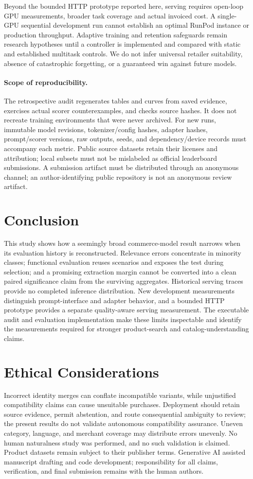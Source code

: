 Beyond the bounded HTTP prototype reported here, serving requires open-loop GPU measurements, broader task coverage and actual invoiced cost. A single-GPU sequential development run cannot establish an optimal RunPod instance or production throughput. Adaptive training and retention safeguards remain research hypotheses until a controller is implemented and compared with static and established multitask controls. We do not infer universal retailer suitability, absence of catastrophic forgetting, or a guaranteed win against future models.

\paragraph{Scope of reproducibility.}
The retrospective audit regenerates tables and curves from saved evidence, exercises actual scorer counterexamples, and checks source hashes. It does not recreate training environments that were never archived. For new runs, immutable model revisions, tokenizer/config hashes, adapter hashes, prompt/scorer versions, raw outputs, seeds, and dependency/device records must accompany each metric. Public source datasets retain their licenses and attribution; local subsets must not be mislabeled as official leaderboard submissions. A submission artifact must be distributed through an anonymous channel; an author-identifying public repository is not an anonymous review artifact.

\section{Conclusion}
This study shows how a seemingly broad commerce-model result narrows when its evaluation history is reconstructed. Relevance errors concentrate in minority classes; functional evaluation reuses scenarios and exposes the test during selection; and a promising extraction margin cannot be converted into a clean paired significance claim from the surviving aggregates. Historical serving traces provide no completed inference distribution. New development measurements distinguish prompt-interface and adapter behavior, and a bounded HTTP prototype provides a separate quality-aware serving measurement. The executable audit and evaluation implementation make these limits inspectable and identify the measurements required for stronger product-search and catalog-understanding claims.

\section{Ethical Considerations}
Incorrect identity merges can conflate incompatible variants, while unjustified compatibility claims can cause unsuitable purchases. Deployment should retain source evidence, permit abstention, and route consequential ambiguity to review; the present results do not validate autonomous compatibility assurance. Uneven category, language, and merchant coverage may distribute errors unevenly. No human naturalness study was performed, and no such validation is claimed. Product datasets remain subject to their publisher terms. Generative AI assisted manuscript drafting and code development; responsibility for all claims, verification, and final submission remains with the human authors.
